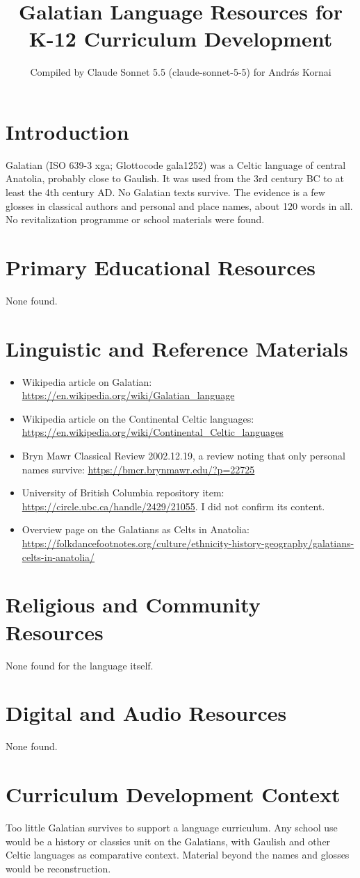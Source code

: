 \documentclass[12pt]{article}
\title{Galatian Language Resources for K-12 Curriculum Development}
\author{Compiled by Claude Sonnet 5.5 (claude-sonnet-5-5) for Andr\'as Kornai}
\date{}
\begin{document}
\maketitle

\section{Introduction}
Galatian (ISO 639-3 xga; Glottocode gala1252) was a Celtic language of central Anatolia, probably close to Gaulish. It was used from the 3rd century BC to at least the 4th century AD. No Galatian texts survive. The evidence is a few glosses in classical authors and personal and place names, about 120 words in all. No revitalization programme or school materials were found.

\section{Primary Educational Resources}
None found.

\section{Linguistic and Reference Materials}
\begin{itemize}
\item Wikipedia article on Galatian: \url{https://en.wikipedia.org/wiki/Galatian_language}
\item Wikipedia article on the Continental Celtic languages: \url{https://en.wikipedia.org/wiki/Continental_Celtic_languages}
\item Bryn Mawr Classical Review 2002.12.19, a review noting that only personal names survive: \url{https://bmcr.brynmawr.edu/?p=22725}
\item University of British Columbia repository item: \url{https://circle.ubc.ca/handle/2429/21055}. I did not confirm its content.
\item Overview page on the Galatians as Celts in Anatolia: \url{https://folkdancefootnotes.org/culture/ethnicity-history-geography/galatians-celts-in-anatolia/}
\end{itemize}

\section{Religious and Community Resources}
None found for the language itself.

\section{Digital and Audio Resources}
None found.

\section{Curriculum Development Context}
Too little Galatian survives to support a language curriculum. Any school use would be a history or classics unit on the Galatians, with Gaulish and other Celtic languages as comparative context. Material beyond the names and glosses would be reconstruction.
\end{document}
